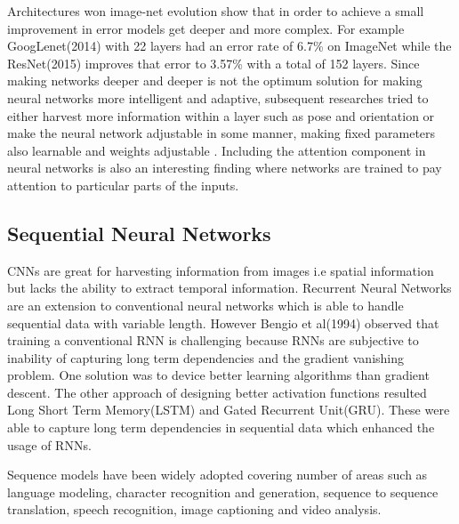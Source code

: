 Architectures won image-net evolution show that in order to achieve a small improvement in error models get deeper and more complex. For example GoogLenet(2014)\cite{szegedy2015going} with 22 layers had an error rate of 6.7\% on ImageNet while the ResNet(2015)\cite{he2016deep} improves that error to 3.57\% with a total of 152 layers. Since making networks deeper and deeper is not the optimum solution for making neural networks more intelligent and adaptive, subsequent researches tried to either harvest more information within a layer such as pose and  orientation\cite{sabour2017dynamic, e2018matrix} or make the neural network adjustable in some manner, making fixed parameters also learnable and weights adjustable \cite{hu2017squeeze,Ha2016}. Including the attention component in neural networks is also an interesting finding where networks are trained to pay attention to particular parts of the inputs\cite{GregorDGW15, xu2015show}.


\subsection{Sequential Neural Networks}
\label{se:rnn}

CNNs are great for harvesting information from images i.e spatial information but lacks the ability to extract temporal information. Recurrent Neural Networks are an extension to conventional neural networks which is able to handle sequential data with variable length\cite{chung2014empirical}. However Bengio et al(1994)\cite{bengio1994learning} observed that training a conventional RNN is challenging because RNNs are subjective to inability of capturing long term dependencies\cite{bengio1994learning} and the gradient vanishing problem. One solution was to device better learning algorithms than gradient descent\cite{bengio2013advances,martens2011learning}. The other approach of designing better activation functions resulted Long Short Term Memory(LSTM)\cite{hochreiter1997long} and Gated Recurrent Unit(GRU)\cite{cho2014properties}. These were able to capture long term dependencies in sequential data which enhanced the usage of RNNs. 

Sequence models have been widely adopted covering number of areas such as language modeling\cite{mikolov2010recurrent}, character recognition and generation\cite{graves2013generating, GregorDGW15}, sequence to sequence translation\cite{sutskever2014sequence}, speech recognition\cite{graves2013speech}, image captioning\cite{vinyals2015show, karpathy2015deep} and video analysis\cite{donahue2015long}.


